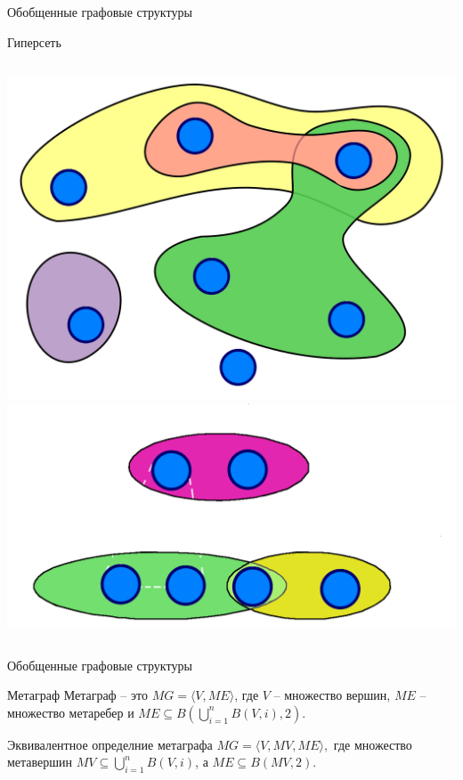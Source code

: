 \documentclass{beamer}
\begin{document}
\begin{darkframes}
\begin{frame}[label=lists]{Обобщенные графовые структуры}
\begin{block}{Гиперсеть}
						\end{block}
						\begin{columns}[onlytextwidth]
						 \centering
							\includegraphics[scale=0.1]{resources/hypergraph}
						 \centering
							\includegraphics[scale=0.1]{resources/hypernetwork}
						\end{columns}
		\end{frame}
		

	\begin{frame}[label=lists]{Обобщенные графовые структуры}
			\begin{block}{Метаграф}
				\centering
				\alert{Метаграф} -- это $MG=\langle V, ME \rangle$, где $V$ -- множество вершин, $ME$ -- множество \alert{метаребер} и $ME\subseteq B( \bigcup \limits_{i=1}^{n}B(V, i),2)$.
						 
			\end{block}

		 \begin{block}{Эквивалентное определние метаграфа}
			 \centering
			 $MG=\langle V, MV, ME \rangle,$ где множество \alert{метавершин} $MV \subseteq \bigcup \limits_{i=1}^{n}B(V, i)$, а $ME\subseteq B(MV,2)$. 
			\end{block}
	

\end{frame}
\end{darkframes}
\end{document}
